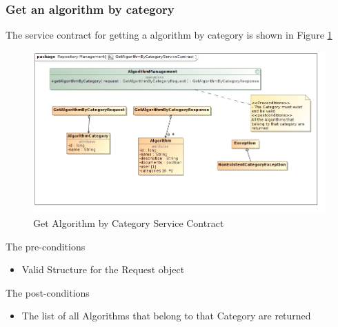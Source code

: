 \subsubsection {Get an algorithm by category}
The service contract for getting a algorithm by category is shown in Figure \ref{fig:getAlgoByCategoryService}
\begin{figure}[H]
  \begin{center}
  \includegraphics[scale=0.6]{../Diagrams and Charts/Test Data/GetAlgorithmByCategoryServiceContract.jpg}
  \caption{Get Algorithm by Category Service Contract}
  \label{fig:getAlgoByCategoryService}
  \end{center}
  
\end{figure}

The pre-conditions
\begin{itemize}
  \item Valid Structure for the Request object
\end{itemize}

The post-conditions
\begin{itemize}
  \item The list of all Algorithms that belong to that Category are returned
\end{itemize}
